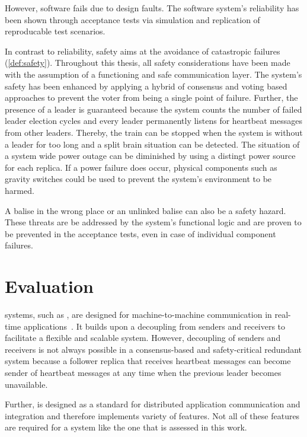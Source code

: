 However, software fails due to design faults.
The software system's reliability has been shown through acceptance tests via simulation and replication of reproducable test scenarios.

In contrast to reliability, safety aims at the avoidance of catastropic failures (\autoref{def:safety}).
Throughout this thesis, all safety considerations have been made with the assumption of a functioning and safe communication layer.
The system's safety has been enhanced by applying a hybrid of consensus and voting based approaches to prevent the voter from being a single point of failure.
Further, the presence of a leader is guaranteed because the system counts the number of failed leader election cycles and every leader permanently listens for heartbeat messages from other leaders.
Thereby, the train can be stopped when the system is without a leader for too long and a split brain situation can be detected.
The situation of a system wide power outage can be diminished by using a distingt power source for each replica.
If a power failure does occur, physical components such as gravity switches could be used to prevent the system's environment to be harmed.

A balise in the wrong place or an unlinked balise can also be a safety hazard.
These threats are be addressed by the system's functional logic and are proven to be prevented in the acceptance tests, even in case of individual component failures.

\section{ Evaluation}
 systems, such as , are designed for machine-to-machine communication in real-time applications~\cite{omgDDSspec}.
It builds upon a decoupling from senders and receivers to facilitate a flexible and scalable system.
However, decoupling of senders and receivers is not always possible in a consensus-based and safety-critical redundant system because a follower replica that receives heartbeat messages can become sender of heartbeat messages at any time when the previous leader becomes unavailable.

Further,  is designed as a standard for distributed application communication and integration and therefore implements variety of features.
Not all of these features are required for a system like the one that is assessed in this work.
\\

